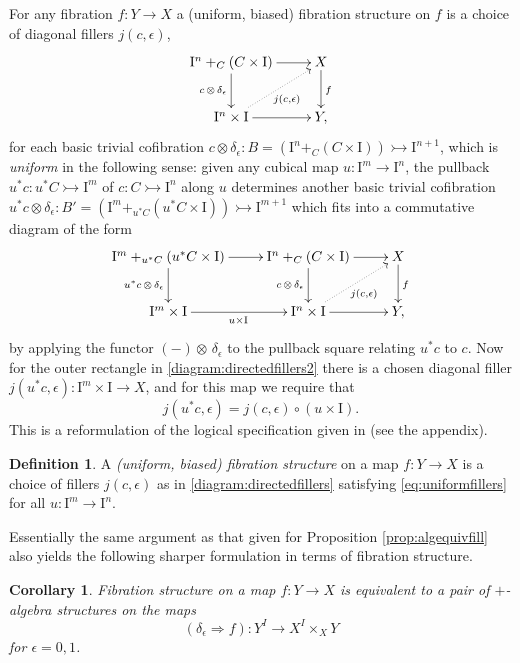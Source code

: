 \documentclass[11pt]{article}
\newcommand{\mono}{\ensuremath{\rightarrowtail}}
\newcommand{\I}{\ensuremath{\mathrm{I}}}
\newtheorem{corollary}[theorem]{Corollary}
\theoremstyle{remark}
\theoremstyle{definition}
\newtheorem{definition}[theorem]{Definition}
\begin{document}
For any fibration $f:Y\to X$  a (uniform, biased) fibration structure on $f$ is a choice of diagonal fillers $j(c,\epsilon)$,
\begin{equation}\label{diagram:directedfillers}
\xymatrix{
\I^n +_C (C\times\I) \ar[d]_{c\,\otimes\,\delta_\epsilon} \ar[r] & X \ar[d]^f \\
\I^{n}\times \I \ar@{.>}[ru]_{j(c,\epsilon)} \ar[r] & Y,
}
\end{equation}
for each basic trivial cofibration $c \otimes \delta_\epsilon : B = (\I^n +_C (C\times\I)) \mono \I^{n+1}$, which is \emph{uniform} in the following sense: given any cubical map $u : \I^m \to \I^n$, the pullback $u^*c : u^*C\mono \I^m$ of $c : C\mono \I^n$ along $u$ determines another basic trivial cofibration $u^*c \otimes \delta_\epsilon : B' = (\I^m +_{u^*C} (u^*C\times\I)) \mono \I^{m+1}$ which fits into a commutative diagram of the form
\begin{equation}\label{diagram:directedfillers2}
\xymatrix{
\I^m +_{u^*C} (u^*C\times\I) \ar[d]_{u^*c\,\otimes\,\delta_\epsilon} \ar[r] & \I^n +_C (C\times\I) \ar[d]_{c\,\otimes\,\delta_\epsilon} \ar[r] & X \ar[d]^f \\
\I^{m}\times \I  \ar[r]_{u\times \I} & \I^{n}\times \I \ar@{.>}[ru]_{j(c,\epsilon)} \ar[r] & Y,
}
\end{equation}
by applying the functor $(-)\otimes\,\delta_\epsilon$ to the pullback square relating $u^*c$ to $c$.  Now for the outer rectangle in \eqref{diagram:directedfillers2} there is a chosen diagonal filler $j(u^*c,\epsilon): \I^m\times\I\to X$, and for this map we require that
\begin{equation}\label{eq:uniformfillers}
j(u^*c,\epsilon) = j(c,\epsilon)\circ (u\times \I).
\end{equation}
This is a reformulation of the logical specification given in \cite{CCHM} (see the appendix).

\begin{definition} A \emph{(uniform, biased) fibration structure} on a map $f: Y\to X$ is a choice of fillers $j(c,\epsilon)$ as in \eqref{diagram:directedfillers} satisfying \eqref{eq:uniformfillers} for all $u : \I^m\to\I^n$.
\end{definition}

Essentially the same argument as that given for Proposition \ref{prop:algequivfill} also yields the following sharper formulation in terms of fibration structure.
\begin{corollary}
Fibration structure on a map $f : Y\to X$ is equivalent to a pair of $+$-algebra structures on the maps $$(\delta_\epsilon\Rightarrow{f}) : Y^I \to X^I\times_X Y$$ for $\epsilon = 0,1$.
\end{corollary}
\end{document}
